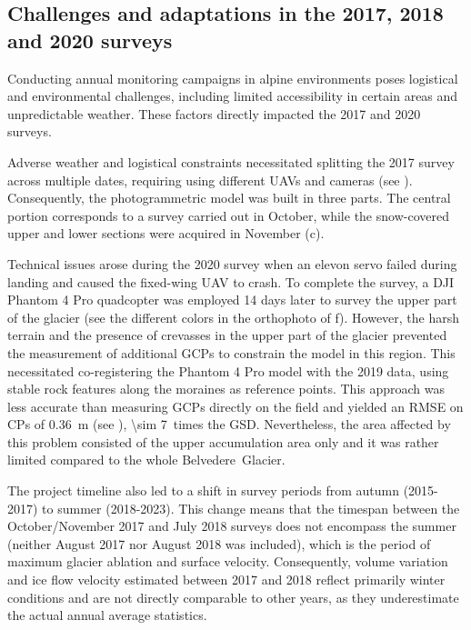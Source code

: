\subsection{Challenges and adaptations in the 2017, 2018 and 2020 surveys}\label{sec:3:problems} 

Conducting annual monitoring campaigns in alpine environments poses logistical and environmental
challenges, including limited accessibility in certain areas and unpredictable weather. 
These factors directly impacted the 2017 and 2020 surveys.

Adverse weather and logistical constraints necessitated splitting the 2017 survey across 
multiple dates, requiring using different UAVs and cameras (see ). 
Consequently, the photogrammetric model was built in three parts. 
The central portion corresponds to a survey carried out in October, while the snow-covered 
upper and lower sections were acquired in November (c).

Technical issues arose during the 2020 survey when an elevon servo failed during landing and
caused the fixed-wing UAV to crash.
To complete the survey, a DJI Phantom 4 Pro quadcopter was employed 14 days later to survey 
the upper part of the glacier (see the different colors in the orthophoto of
f).
However, the harsh terrain and the presence of crevasses in the upper part of the glacier 
prevented the measurement of additional GCPs to constrain the model in this region. 
This necessitated co-registering the Phantom 4 Pro model with the 2019 data, 
using stable rock features along the moraines as reference points. 
This approach was less accurate than measuring GCPs directly on the field and yielded an
RMSE on CPs of \SI{0.36}{\meter} (see ), \SI{\sim 7}{}~times the GSD.
Nevertheless, the area affected by this problem consisted of the upper accumulation area only
and it was rather limited compared to the whole Belvedere~Glacier.

The project timeline also led to a shift in survey periods from autumn (2015-2017) 
to summer (2018-2023).
This change means that the timespan between the October/November 2017 and July 2018 
surveys does not encompass the summer (neither August 2017 nor August 2018 was included), 
which is the period of maximum glacier ablation and surface velocity. 
Consequently, volume variation and ice flow velocity estimated between 2017 and 2018 reflect
primarily winter conditions and are not directly comparable to other years, as they underestimate
the actual annual average statistics.

